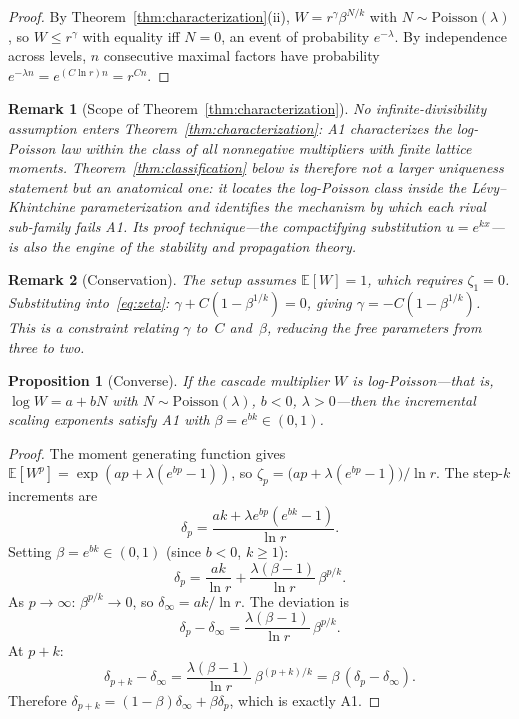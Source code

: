 \documentclass[pdflatex,sn-mathphys-num]{sn-jnl}
\theoremstyle{thmstyleone}
\newtheorem{proposition}[theorem]{Proposition}
\theoremstyle{thmstyletwo}
\newtheorem*{remark}{Remark}
\theoremstyle{thmstylethree}
\begin{document}
\begin{proof}
By Theorem~\ref{thm:characterization}(ii), $W = r^\gamma
\beta^{N/k}$ with $N \sim \mathrm{Poisson}(\lambda)$, so $W \le
r^\gamma$ with equality iff $N = 0$, an event of probability
$e^{-\lambda}$.  By independence across levels, $n$ consecutive
maximal factors have probability $e^{-\lambda n} =
e^{(C\ln r) n} = r^{Cn}$.
\end{proof}

\begin{remark}[Scope of Theorem~\ref{thm:characterization}]
No infinite-divisibility assumption enters
Theorem~\ref{thm:characterization}: A1 characterizes the log-Poisson
law within the class of \emph{all} nonnegative multipliers with
finite lattice moments.  Theorem~\ref{thm:classification} below is
therefore not a larger uniqueness statement but an anatomical one:
it locates the log-Poisson class inside the L\'evy--Khintchine
parameterization and identifies the mechanism by which each rival
sub-family fails A1.  Its proof technique---the compactifying
substitution $u = e^{kx}$---is also the engine of the stability and
propagation theory.
\end{remark}

\begin{remark}[Conservation]
The setup assumes $\mathbb{E}[W] = 1$, which requires $\zeta_1 = 0$.
Substituting into~\eqref{eq:zeta}: $\gamma + C(1 - \beta^{1/k}) =
0$, giving $\gamma = -C(1-\beta^{1/k})$.  This is a constraint
relating $\gamma$ to~$C$ and~$\beta$, reducing the free parameters
from three to two.
\end{remark}


\begin{proposition}[Converse]\label{prop:converse}
If the cascade multiplier $W$ is log-Poisson---\allowbreak that is,
$\log W = a + bN$ with $N \sim \mathrm{Poisson}(\lambda)$, $b < 0$, $\lambda >
0$---then the incremental scaling exponents satisfy A1 with $\beta =
e^{bk} \in (0,1)$.
\end{proposition}

\begin{proof}
The moment generating function gives $\mathbb{E}[W^p] = \exp(ap +
\lambda(e^{bp} - 1))$, so $\zeta_p = \bigl(ap + \lambda(e^{bp} -
1)\bigr)/\ln r$.  The step-$k$ increments are
\[
  \delta_p = \frac{ak + \lambda e^{bp}(e^{bk}-1)}{\ln r}.
\]
Setting $\beta = e^{bk} \in (0,1)$ (since $b < 0$, $k \geq 1$):
\[
  \delta_p = \frac{ak}{\ln r}
  + \frac{\lambda(\beta - 1)}{\ln r}\,\beta^{p/k}.
\]
As $p \to \infty$: $\beta^{p/k} \to 0$, so $\delta_\infty = ak/\ln
r$.  The deviation is
\[
  \delta_p - \delta_\infty
  = \frac{\lambda(\beta - 1)}{\ln r}\,\beta^{p/k}.
\]
At $p + k$:
\[
  \delta_{p+k} - \delta_\infty
  = \frac{\lambda(\beta-1)}{\ln r}\,\beta^{(p+k)/k}
  = \beta\,(\delta_p - \delta_\infty).
\]
Therefore $\delta_{p+k} = (1-\beta)\delta_\infty + \beta\delta_p$,
which is exactly A1.
\end{proof}
\end{document}
